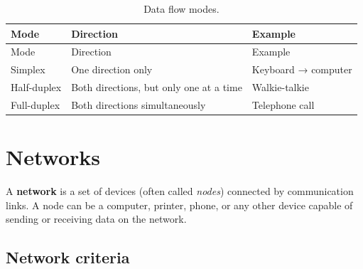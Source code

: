 \documentclass[
  letterpaper,
  DIV=11,
  numbers=noendperiod]{scrreprt}
\begin{document}
\begin{longtable}[]{@{}
  >{\raggedright\arraybackslash}p{}
  >{\raggedright\arraybackslash}p{}
  >{\raggedright\arraybackslash}p{}@{}}
\caption{Data flow modes.}\label{tbl-flow}\tabularnewline
\toprule\noalign{}
\begin{minipage}[b]{\linewidth}\raggedright
Mode
\end{minipage} & \begin{minipage}[b]{\linewidth}\raggedright
Direction
\end{minipage} & \begin{minipage}[b]{\linewidth}\raggedright
Example
\end{minipage} \\
\midrule\noalign{}
\endfirsthead
\toprule\noalign{}
\begin{minipage}[b]{\linewidth}\raggedright
Mode
\end{minipage} & \begin{minipage}[b]{\linewidth}\raggedright
Direction
\end{minipage} & \begin{minipage}[b]{\linewidth}\raggedright
Example
\end{minipage} \\
\midrule\noalign{}
\endhead
\bottomrule\noalign{}
\endlastfoot
Simplex & One direction only & Keyboard → computer \\
Half-duplex & Both directions, but only one at a time & Walkie-talkie \\
Full-duplex & Both directions simultaneously & Telephone call \\
\end{longtable}

\section{Networks}\label{sec-networks}

A \textbf{network} is a set of devices (often called \emph{nodes})
connected by communication links. A node can be a computer, printer,
phone, or any other device capable of sending or receiving data on the
network.

\subsection{Network criteria}\label{network-criteria}
\end{document}
